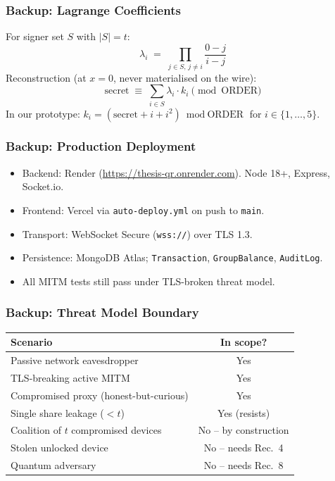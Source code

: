 \documentclass{beamer}
\newcommand{\pos}[1]{\textcolor{positive}{#1}}
\newcommand{\con}[1]{\textcolor{negative}{#1}}
\newcommand{\HL}[1]{\textcolor{emphasis}{#1}}
\begin{document}
\begin{frame}
  \frametitle{Backup: Lagrange Coefficients}
  For signer set $S$ with $|S| = t$:
  \[
  \lambda_i \;=\; \prod_{j \in S,\, j \neq i} \frac{0 - j}{i - j}
  \]
  Reconstruction (at $x = 0$, never materialised on the wire):
  \[
  \text{secret} \;\equiv\; \sum_{i \in S} \lambda_i \cdot k_i \pmod{\text{ORDER}}
  \]
  In our prototype: $k_i = (\text{secret} + i + i^2) \bmod \text{ORDER}$ for $i \in \{1, \ldots, 5\}$.
\end{frame}

\begin{frame}
  \frametitle{Backup: Production Deployment}
  \begin{itemize}
    \item Backend: Render (\url{https://thesis-qr.onrender.com}). Node 18+, Express, Socket.io.
    \item Frontend: Vercel via \texttt{auto-deploy.yml} on push to \texttt{main}.
    \item Transport: WebSocket Secure (\texttt{wss://}) over TLS 1.3.
    \item Persistence: MongoDB Atlas; \texttt{Transaction}, \texttt{GroupBalance}, \texttt{AuditLog}.
    \item All MITM tests still pass under \HL{TLS-broken} threat model.
  \end{itemize}
\end{frame}

\begin{frame}
  \frametitle{Backup: Threat Model Boundary}
  \begin{center}
  \small
  \begin{tabular}{|p{}|c|}
    \hline
    \textbf{Scenario} & \textbf{In scope?} \\\hline
    Passive network eavesdropper & \pos{Yes} \\\hline
    TLS-breaking active MITM & \pos{Yes} \\\hline
    Compromised proxy (honest-but-curious) & \pos{Yes} \\\hline
    Single share leakage ($< t$) & \pos{Yes} (resists) \\\hline
    Coalition of $t$ compromised devices & \con{No -- by construction} \\\hline
    Stolen unlocked device & \con{No -- needs Rec.~4} \\\hline
    Quantum adversary & \con{No -- needs Rec.~8} \\\hline
  \end{tabular}
  \end{center}
\end{frame}
\end{document}
